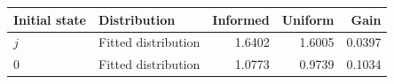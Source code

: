 \begin{tabular}{llrrr}\toprule
Initial state & Distribution & Informed & Uniform & Gain\\\midrule
$j$ & Fitted distribution & 1.6402 & 1.6005 & 0.0397 \\
$0$ & Fitted distribution & 1.0773 & 0.9739 & 0.1034 \\
\bottomrule\end{tabular}
